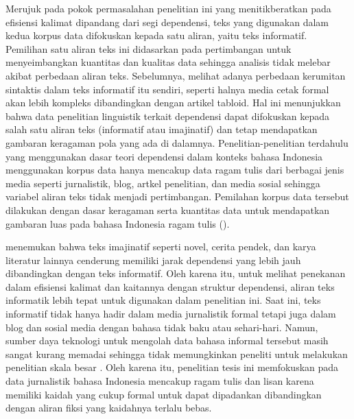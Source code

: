 Merujuk pada pokok permasalahan penelitian ini yang menitikberatkan pada efisiensi kalimat dipandang dari segi dependensi, teks yang digunakan dalam kedua korpus data difokuskan kepada satu aliran, yaitu teks informatif. Pemilihan satu aliran teks ini didasarkan pada pertimbangan untuk menyeimbangkan kuantitas dan kualitas data sehingga analisis tidak melebar akibat perbedaan aliran teks. Sebelumnya, \cite{miller2011critical} melihat adanya perbedaan kerumitan sintaktis dalam teks informatif itu sendiri, seperti halnya media cetak formal akan lebih kompleks dibandingkan dengan artikel tabloid. Hal ini menunjukkan bahwa data penelitian linguistik terkait dependensi dapat difokuskan kepada salah satu aliran teks (informatif atau imajinatif) dan tetap mendapatkan gambaran keragaman pola yang ada di dalamnya. Penelitian-penelitian terdahulu yang menggunakan dasar teori dependensi dalam konteks bahasa Indonesia menggunakan korpus data hanya mencakup data ragam tulis dari berbagai jenis media seperti jurnalistik, blog, artkel penelitian, dan media sosial sehingga variabel aliran teks tidak menjadi pertimbangan. Pemilahan korpus data tersebut dilakukan dengan dasar keragaman serta kuantitas data untuk mendapatkan gambaran luas pada bahasa Indonesia ragam tulis (\citealp{kamayani2011dependency, green2012indonesian, irmawati2015dependency, futrell2015large}). 

\cite{wang2017effects} menemukan bahwa teks imajinatif seperti novel, cerita pendek, dan karya literatur lainnya cenderung memiliki jarak dependensi yang lebih jauh dibandingkan dengan teks informatif. Oleh karena itu, untuk melihat penekanan dalam efisiensi kalimat dan kaitannya dengan struktur dependensi, aliran teks informatik lebih tepat untuk digunakan dalam penelitian ini. Saat ini, teks informatif tidak hanya hadir dalam media jurnalistik formal tetapi juga dalam blog dan sosial media dengan bahasa tidak baku atau sehari-hari. Namun, sumber daya teknologi untuk mengolah data bahasa informal tersebut masih sangat kurang memadai sehingga tidak memungkinkan peneliti untuk melakukan penelitian skala besar \citep{green2012indonesian}. Oleh karena itu, penelitian tesis ini memfokuskan pada data jurnalistik bahasa Indonesia mencakup ragam tulis dan lisan karena memiliki kaidah yang cukup formal untuk dapat dipadankan dibandingkan dengan aliran fiksi yang kaidahnya terlalu bebas. 

